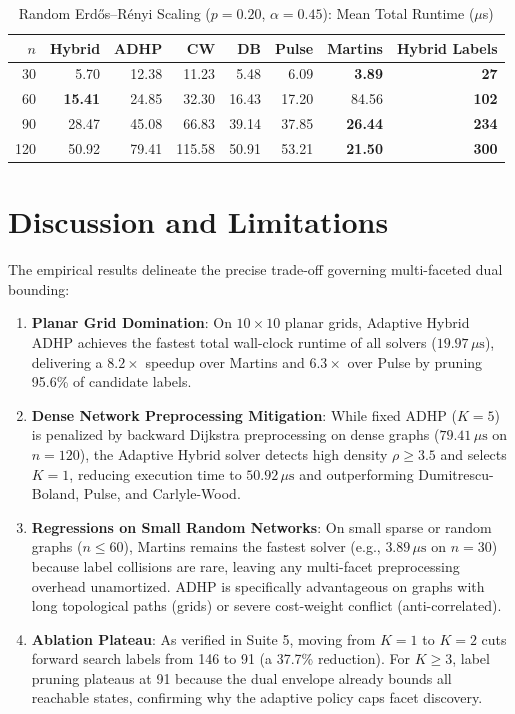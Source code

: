 \documentclass[11pt,a4paper]{article}
\begin{document}
\begin{table}[ht]
\centering
\small
\caption{Random Erd\H{o}s--R\'enyi Scaling ($p=0.20$, $\alpha=0.45$): Mean Total Runtime ($\mu$s)}
\begin{tabular}{r rrrrrr r}
\toprule
$n$ & \textbf{Hybrid} & ADHP & CW & DB & Pulse & Martins & \textbf{Hybrid Labels} \\
\midrule
30  & 5.70 & 12.38 & 11.23 & 5.48 & 6.09 & \textbf{3.89} & \textbf{27} \\
60  & \textbf{15.41} & 24.85 & 32.30 & 16.43 & 17.20 & 84.56 & \textbf{102} \\
90  & 28.47 & 45.08 & 66.83 & 39.14 & 37.85 & \textbf{26.44} & \textbf{234} \\
120 & 50.92 & 79.41 & 115.58 & 50.91 & 53.21 & \textbf{21.50} & \textbf{300} \\
\bottomrule
\end{tabular}
\end{table}

\section{Discussion and Limitations}
The empirical results delineate the precise trade-off governing multi-faceted dual bounding:
\begin{enumerate}
    \item \textbf{Planar Grid Domination}: On $10 \times 10$ planar grids, Adaptive Hybrid ADHP achieves the fastest total wall-clock runtime of all solvers ($19.97 \, \mu\text{s}$), delivering a $8.2\times$ speedup over Martins and $6.3\times$ over Pulse by pruning 95.6\% of candidate labels.
    \item \textbf{Dense Network Preprocessing Mitigation}: While fixed ADHP ($K=5$) is penalized by backward Dijkstra preprocessing on dense graphs ($79.41 \, \mu\text{s}$ on $n=120$), the Adaptive Hybrid solver detects high density $\rho \ge 3.5$ and selects $K=1$, reducing execution time to $50.92 \, \mu\text{s}$ and outperforming Dumitrescu-Boland, Pulse, and Carlyle-Wood.
    \item \textbf{Regressions on Small Random Networks}: On small sparse or random graphs ($n \le 60$), Martins remains the fastest solver (e.g., $3.89 \, \mu\text{s}$ on $n=30$) because label collisions are rare, leaving any multi-facet preprocessing overhead unamortized. ADHP is specifically advantageous on graphs with long topological paths (grids) or severe cost-weight conflict (anti-correlated).
    \item \textbf{Ablation Plateau}: As verified in Suite 5, moving from $K=1$ to $K=2$ cuts forward search labels from 146 to 91 (a 37.7\% reduction). For $K \ge 3$, label pruning plateaus at 91 because the dual envelope already bounds all reachable states, confirming why the adaptive policy caps facet discovery.
\end{enumerate}
\end{document}
